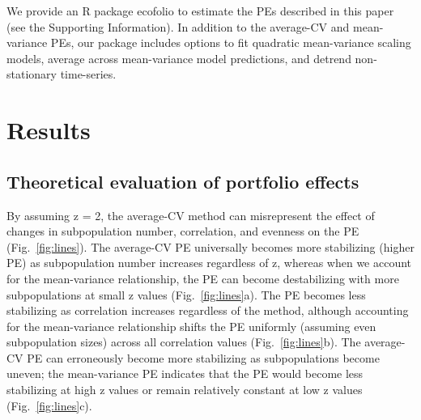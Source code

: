 We provide an R package ecofolio to estimate the PEs described in this
paper (see the Supporting Information). In addition to the average-CV and
mean-variance PEs, our package includes options to fit quadratic mean-variance
scaling models, average across mean-variance model predictions, and detrend
non-stationary time-series.

\section{Results}

\subsection{Theoretical evaluation of portfolio effects}

By assuming z = 2, the average-CV method can misrepresent the effect of changes
in subpopulation number, correlation, and evenness on the PE
(Fig.~\ref{fig:lines}). The average-CV PE universally becomes more stabilizing
(higher PE) as subpopulation number increases regardless of z, whereas
when we account for the mean-variance relationship, the PE can become
destabilizing with more subpopulations at small z values
(Fig.~\ref{fig:lines}a). The PE becomes less stabilizing as correlation
increases regardless of the method, although accounting for the mean-variance
relationship shifts the PE uniformly (assuming even subpopulation sizes) across
all correlation values (Fig.~\ref{fig:lines}b). The average-CV PE can
erroneously become more stabilizing as subpopulations become uneven; the
mean-variance PE indicates that the PE would become less stabilizing at high z
values or remain relatively constant at low z values (Fig.~\ref{fig:lines}c).

